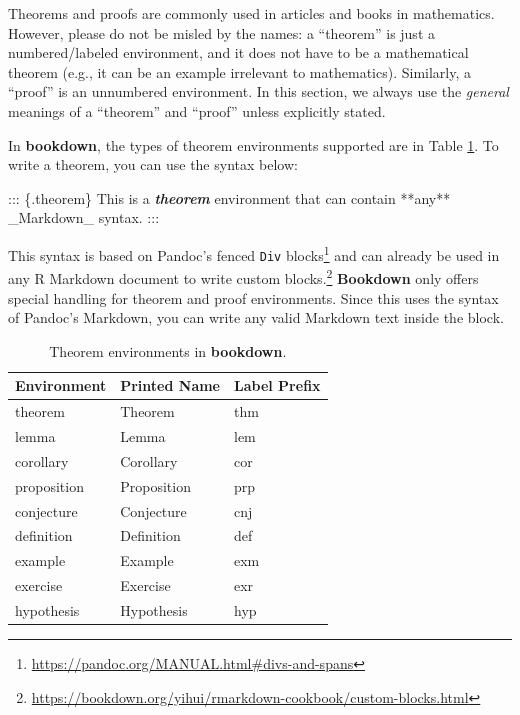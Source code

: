 \documentclass[
  12pt,
]{krantz}
\newenvironment{Shaded}{\begin{snugshade}}{\end{snugshade}}
\newcommand{\InformationTok}[1]{\textcolor[rgb]{0.56,0.35,0.01}{\textbf{\textit{#1}}}}
\newcommand{\NormalTok}[1]{#1}
\renewcommand{\href}[2]{#2\footnote{\url{#1}}}
\theoremstyle{definition}
\theoremstyle{definition}
\theoremstyle{definition}
\theoremstyle{definition}
\theoremstyle{remark}
\begin{document}
Theorems and proofs are commonly used in articles and books in mathematics. However, please do not be misled by the names: a ``theorem'' is just a numbered/labeled environment, and it does not have to be a mathematical theorem (e.g., it can be an example irrelevant to mathematics). Similarly, a ``proof'' is an unnumbered environment. In this section, we always use the \emph{general} meanings of a ``theorem'' and ``proof'' unless explicitly stated.

In \textbf{bookdown}, the types of theorem environments supported are in Table \ref{tab:theorem-envs}. To write a theorem, you can use the syntax below:

\begin{Shaded}
\begin{Highlighting}[]
\NormalTok{::: \{.theorem\}}
\NormalTok{This is a }\InformationTok{\textasciigrave{}theorem\textasciigrave{}}\NormalTok{ environment that can contain **any**}
\NormalTok{\_Markdown\_ syntax.}
\NormalTok{:::}
\end{Highlighting}
\end{Shaded}

This syntax is based on Pandoc's \href{https://pandoc.org/MANUAL.html\#divs-and-spans}{fenced \texttt{Div} blocks} and can already be used in any R Markdown document to write \href{https://bookdown.org/yihui/rmarkdown-cookbook/custom-blocks.html}{custom blocks.} \textbf{Bookdown} only offers special handling for theorem and proof environments. Since this uses the syntax of Pandoc's Markdown, you can write any valid Markdown text inside the block.



\begin{table}

\caption{\label{tab:theorem-envs}Theorem environments in \textbf{bookdown}.}
\centering
\begin{tabular}[t]{lll}
\toprule
Environment & Printed Name & Label Prefix\\
\midrule
theorem & Theorem & thm\\
lemma & Lemma & lem\\
corollary & Corollary & cor\\
proposition & Proposition & prp\\
conjecture & Conjecture & cnj\\
\addlinespace
definition & Definition & def\\
example & Example & exm\\
exercise & Exercise & exr\\
hypothesis & Hypothesis & hyp\\
\bottomrule
\end{tabular}
\end{table}
\end{document}
